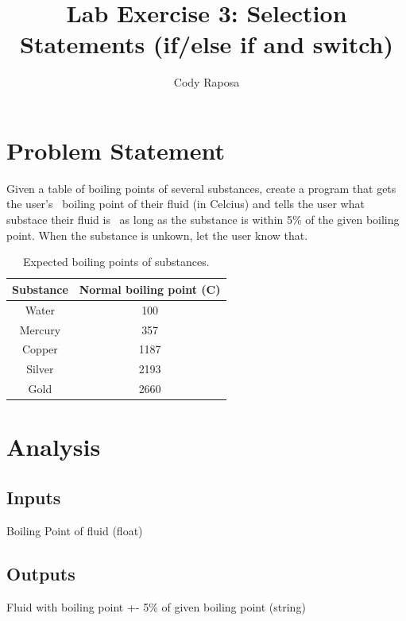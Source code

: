 \documentclass{article}
\title{Lab Exercise 3: Selection Statements (if/else if and switch)}
\author{Cody Raposa}
\affil{ELEC2850 Microcontrollers Using C Programming}
\begin{document}
\maketitle
\begin{flushleft}
  \section{Problem Statement}
  Given a table of boiling points of several substances, create a program that gets the user's \
  boiling point of their fluid (in \textdegree Celcius) and tells the user what substace their fluid is \
  as long as the substance is within 5\% of the given boiling point. When the substance is unkown, let the user know that.
  \begin{table}[h]
    \caption{Expected boiling points of substances.}
    \begin{center}
      \begin{tabular}{ c c }
        Substance & Normal boiling point (\textdegree C) \\
        \hline
        Water     & 100                                  \\
        Mercury   & 357                                  \\
        Copper    & 1187                                 \\
        Silver    & 2193                                 \\
        Gold      & 2660                                 \\
        \hline
      \end{tabular}
    \end{center}
  \end{table}
  \section{Analysis}
  \subsection{Inputs}
  Boiling Point of fluid (float)
  \subsection{Outputs}
  Fluid with boiling point +- 5\% of given boiling point (string)
  \newpage

\end{flushleft}
\end{document}

